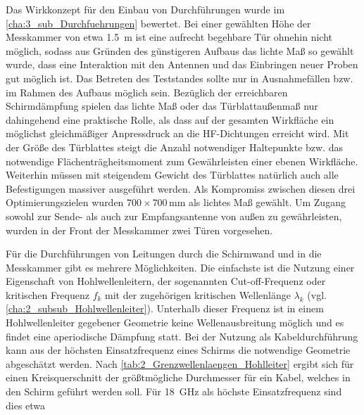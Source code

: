 \par
\vspace{\linespace} 
Das Wirkkonzept für den Einbau von Durchführungen wurde im \Abschnitt\ref{cha:3_sub_Durchfuehrungen} bewertet. Bei einer gewählten Höhe der Messkammer von etwa \SI{1,5}{\meter} ist eine aufrecht begehbare Tür ohnehin nicht möglich, sodass aus Gründen des günstigeren Aufbaus das lichte Maß so gewählt wurde, dass eine Interaktion mit den Antennen und das Einbringen neuer Proben gut möglich ist. Das Betreten des Teststandes sollte nur in Ausnahmefällen bzw. im Rahmen des Aufbaus möglich sein. Bezüglich der erreichbaren Schirmdämpfung spielen das lichte Maß oder das Türblattaußenmaß nur dahingehend eine praktische Rolle, als dass auf der gesamten Wirkfläche ein möglichst gleichmäßiger Anpressdruck an die HF-Dichtungen erreicht wird. Mit der Größe des Türblattes steigt die Anzahl notwendiger Haltepunkte bzw. das notwendige Flächenträgheitsmoment zum Gewährleisten einer ebenen Wirkfläche. Weiterhin müssen mit steigendem Gewicht des Türblattes natürlich auch alle Befestigungen massiver ausgeführt werden. Als Kompromiss zwischen diesen drei Optimierungszielen wurden $700 \times 700\,\si{\milli\meter}$ als lichtes Maß gewählt. Um Zugang sowohl zur Sende- als auch zur Empfangsantenne von außen zu gewährleisten, wurden in der Front der Messkammer zwei Türen vorgesehen.
\par
\vspace{\linespace}
Für die Durchführungen von Leitungen durch die Schirmwand und in die Messkammer gibt es mehrere Möglichkeiten. Die einfachste ist die Nutzung einer Eigenschaft von Hohlwellenleitern, der sogenannten Cut-off-Frequenz oder kritischen Frequenz $f_k$ mit der zugehörigen kritischen Wellenlänge $\lambda_k$ (vgl. \Abschnitt\ref{cha:2_subsub_Hohlwellenleiter}). Unterhalb dieser Frequenz ist in einem Hohlwellenleiter gegebener Geometrie \mbox{keine} Wellenausbreitung möglich und es findet eine aperiodische Dämpfung statt. Bei der Nutzung als \mbox{Kabeldurchführung} kann aus der höchsten Einsatzfrequenz eines Schirms die notwendige Geometrie abgeschätzt werden. Nach \Tabelle\ref{tab:2_Grenzwellenlaengen_Hohlleiter} ergibt sich für einen Kreisquerschnitt der größtmögliche Durchmesser für ein Kabel, welches in den Schirm geführt werden soll. Für \SI{18}{\giga\hertz} als höchste Einsatzfrequenz sind dies etwa


